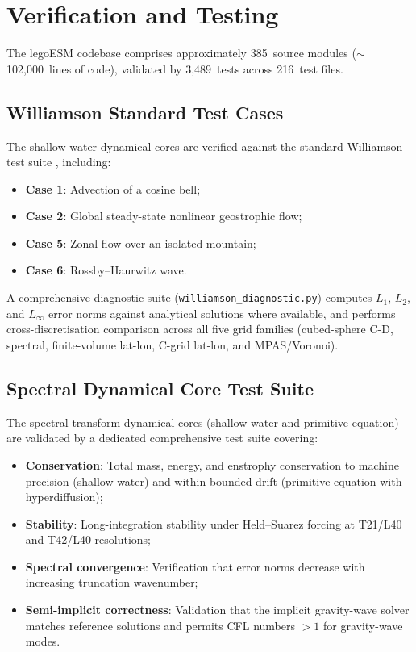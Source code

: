 \documentclass[11pt,twoside]{report}
\begin{document}
\chapter{Verification and Testing}
\label{ch:verification}

The legoESM codebase comprises approximately 385~source modules
($\sim$102{,}000~lines of code), validated by 3{,}489~tests across
216~test files.

\section{Williamson Standard Test Cases}
\label{sec:williamson}

The shallow water dynamical cores are verified against the standard
Williamson test suite \citep{Williamson1992}, including:
\begin{itemize}[nosep]
  \item \textbf{Case 1}: Advection of a cosine bell;
  \item \textbf{Case 2}: Global steady-state nonlinear geostrophic flow;
  \item \textbf{Case 5}: Zonal flow over an isolated mountain;
  \item \textbf{Case 6}: Rossby--Haurwitz wave.
\end{itemize}
A comprehensive diagnostic suite (\texttt{williamson\_diagnostic.py})
computes $L_1$, $L_2$, and $L_\infty$ error norms against analytical
solutions where available, and performs cross-discretisation comparison
across all five grid families (cubed-sphere C-D, spectral, finite-volume
lat-lon, C-grid lat-lon, and MPAS/Voronoi).

\section{Spectral Dynamical Core Test Suite}
\label{sec:spectral-tests}

The spectral transform dynamical cores (shallow water and primitive
equation) are validated by a dedicated comprehensive test suite covering:
\begin{itemize}[nosep]
  \item \textbf{Conservation}: Total mass, energy, and enstrophy
    conservation to machine precision (shallow water) and within
    bounded drift (primitive equation with hyperdiffusion);
  \item \textbf{Stability}: Long-integration stability under
    Held--Suarez forcing at T21/L40 and T42/L40 resolutions;
  \item \textbf{Spectral convergence}: Verification that error norms
    decrease with increasing truncation wavenumber;
  \item \textbf{Semi-implicit correctness}: Validation that the implicit
    gravity-wave solver matches reference solutions and permits
    CFL numbers $>1$ for gravity-wave modes.
\end{itemize}
\end{document}
